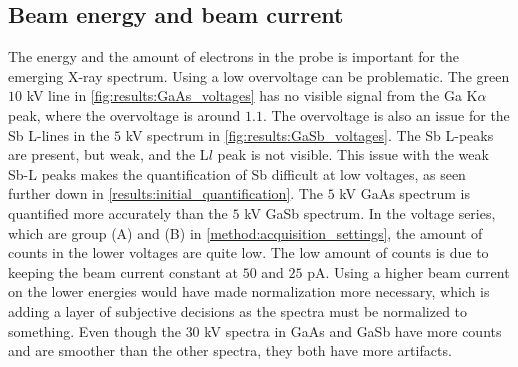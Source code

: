 




\subsection{Beam energy and beam current}
\label{results:beam_energy_and_beam_current}


The energy and the amount of electrons in the probe is important for the emerging X-ray spectrum.
Using a low overvoltage can be problematic.
The green $10$ kV line in \cref{fig:results:GaAs_voltages} has no visible signal from the Ga K$\alpha$ peak, where the overvoltage is around $1.1$.
The overvoltage is also an issue for the Sb L-lines in the $5$ kV spectrum in \cref{fig:results:GaSb_voltages}.
The Sb L-peaks are present, but weak, and the L$l$ peak is not visible.
This issue with the weak Sb-L peaks makes the quantification of Sb difficult at low voltages, as seen further down in \cref{results:initial_quantification}.
The $5$ kV GaAs spectrum is quantified more accurately than the $5$ kV GaSb spectrum.
In the voltage series, which are group (A) and (B) in \cref{method:acquisition_settings}, the amount of counts in the lower voltages are quite low.
The low amount of counts is due to keeping the beam current constant at $50$ and $25$ pA.
Using a higher beam current on the lower energies would have made normalization more necessary, which is adding a layer of subjective decisions as the spectra must be normalized to something.
Even though the $30$ kV spectra in GaAs and GaSb have more counts and are smoother than the other spectra, they both have more artifacts.

